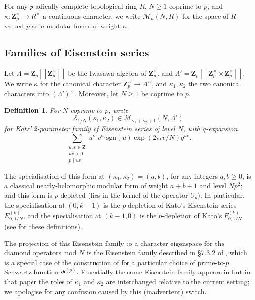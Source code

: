 \documentclass[a4paper,10pt]{amsart}
\theoremstyle{plain}
\newtheorem{definition}[theorem]{Definition}
\theoremstyle{remark}
\newcommand{\ZZ}{\mathbf{Z}}
\newcommand{\Zp}{\ZZ_p}
\newcommand{\cE}{\mathcal{E}}
\newcommand{\cM}{\mathcal{M}}
\newcommand{\sgn}{\mathrm{sgn}}
\numberwithin{equation}{section}
\renewcommand{\ge}{\geqslant}
\begin{document}
 For any $p$-adically complete topological ring $R$, $N \ge 1$ coprime to $p$, and $\kappa : \Zp^\times \to R^\times$ a continuous character, we write $\cM_\kappa(N, R)$ for the space of $R$-valued $p$-adic modular forms of weight $\kappa$.

 \subsection{Families of Eisenstein series}

  Let $\Lambda = \Zp[[\Zp^\times]]$ be the Iwasawa algebra of $\Zp^\times$, and $\Lambda' = \Zp[[\Zp^\times \times \Zp^\times]]$. We write $\kappa$ for the canonical character $\Zp^\times \to \Lambda^\times$, and $\kappa_1, \kappa_2$ the two canonical characters into $(\Lambda')^\times$. Moreover, let $N \ge 1$ be coprime to $p$.%

  \begin{definition}
   For $N$ coprime to $p$, write
   \[ \cE_{1/N}\left(\kappa_1,\kappa_2\right) \in \cM_{\kappa_1 + \kappa_2 + 1}\left(N, \Lambda'\right) \]
   for Katz' 2-parameter family of Eisenstein series of level $N$, with $q$-expansion
   \[ \sum_{\substack{u, v \in \ZZ \\ uv > 0 \\ p \nmid uv}} u^{\kappa_1} v^{\kappa_2} \sgn(u) \exp(2\pi i v / N) q^{uv}. \]
  \end{definition}

  The specialisation of this form at $(\kappa_1, \kappa_2) = (a, b)$, for any integers $a, b \ge 0$, is a classical nearly-holomorphic modular form of weight $a + b + 1$ and level $N p^2$; and this form is $p$-depleted (lies in the kernel of the operator $U_p$). In particular, the specialisation at $(0, k-1)$ is the $p$-depletion of Kato's Eisenstein series $E^{(k)}_{0, 1/N}$, and the specialisation at $(k - 1, 0)$ is the $p$-depletion of Kato's $F^{(k)}_{0, 1/N}$ (see \cite[\S 3.8]{kato04} for these definitions).

  \begin{remark}
   The projection of this Eisenstein family to a character eigenspace for the diamond operators mod $N$ is the Eisenstein family described in \S 7.3.2 of \cite{grossiloefflerzerbesLfunct}, which is a special case of the construction of  \cite[Theorem 7.6]{LPSZ1} for a particular choice of prime-to-$p$ Schwartz function $\Phi^{(p)}$. Essentially the same Eisenstein family appears in \cite{leiloefflerzerbes14} but in that paper the roles of $\kappa_1$ and $\kappa_2$ are interchanged relative to the current setting; we apologise for any confusion caused by this (inadvertent) switch.
  \end{remark}
\end{document}

